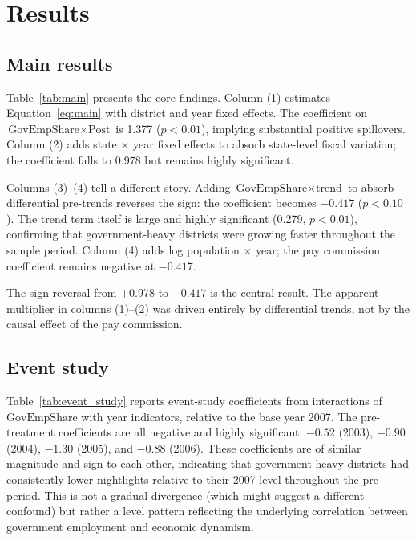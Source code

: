 \documentclass[12pt]{article}
\begin{document}
\section{Results}
\label{sec:results}

\subsection{Main results}

Table~\ref{tab:main} presents the core findings. Column (1) estimates Equation~\ref{eq:main} with district and year fixed effects. The coefficient on $\text{GovEmpShare} \times \text{Post}$ is 1.377 ($p < 0.01$), implying substantial positive spillovers. Column (2) adds state $\times$ year fixed effects to absorb state-level fiscal variation; the coefficient falls to 0.978 but remains highly significant.

Columns (3)--(4) tell a different story. Adding $\text{GovEmpShare} \times \text{trend}$ to absorb differential pre-trends reverses the sign: the coefficient becomes $-0.417$ ($p < 0.10$). The trend term itself is large and highly significant (0.279, $p < 0.01$), confirming that government-heavy districts were growing faster throughout the sample period. Column (4) adds log population $\times$ year; the pay commission coefficient remains negative at $-0.417$.

The sign reversal from +0.978 to $-0.417$ is the central result. The apparent multiplier in columns (1)--(2) was driven entirely by differential trends, not by the causal effect of the pay commission.



\subsection{Event study}

Table~\ref{tab:event_study} reports event-study coefficients from interactions of $\text{GovEmpShare}$ with year indicators, relative to the base year 2007. The pre-treatment coefficients are all negative and highly significant: $-0.52$ (2003), $-0.90$ (2004), $-1.30$ (2005), and $-0.88$ (2006). These coefficients are of similar magnitude and sign to each other, indicating that government-heavy districts had consistently lower nightlights relative to their 2007 level throughout the pre-period. This is not a gradual divergence (which might suggest a different confound) but rather a level pattern reflecting the underlying correlation between government employment and economic dynamism.
\end{document}
